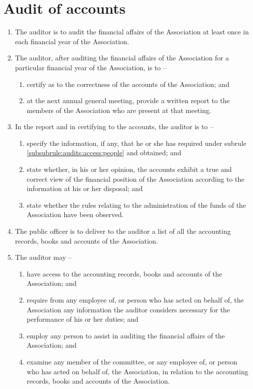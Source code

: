 \section{Audit of accounts}
\label{rule:audits}

\begin{enumerate}
	\item The auditor is to audit the financial affairs of the Association at least once in each financial year of the Association.
	
	\item The auditor, after auditing the financial affairs of the Association for a particular financial year of the Association, is to --
	\begin{enumerate}
		\item certify as to the correctness of the accounts of the Association; and
		\item at the next annual general meeting, provide a written report to the members of the Association who are present at that meeting.
	\end{enumerate}

	\item In the report and in certifying to the accounts, the auditor is to --
	\begin{enumerate}
		\item specify the information, if any, that he or she has required under subrule \ref{subsubrule:audits:access:people} and obtained; and
		\item state whether, in his or her opinion, the accounts exhibit a true and correct view of the financial position of the Association according to the information at his or her disposal; and
		\item state whether the rules relating to the administration of the funds of the Association have been observed.
	\end{enumerate}

	\item The public officer is to deliver to the auditor a list of all the accounting records, books and accounts of the Association.

	\item \label{subrule:audits:access} The auditor may --
	\begin{enumerate}
		\item have access to the accounting records, books and accounts of the Association; and
		\item \label{subsubrule:audits:access:people} require from any employee of, or person who has acted on behalf of, the Association any information the auditor considers necessary for the performance of his or her duties; and
		\item employ any person to assist in auditing the financial affairs of the Association; and
		\item examine any member of the committee, or any employee of, or person who has acted on behalf of, the Association, in relation to the accounting records, books and accounts of the Association.
	\end{enumerate}
\end{enumerate}